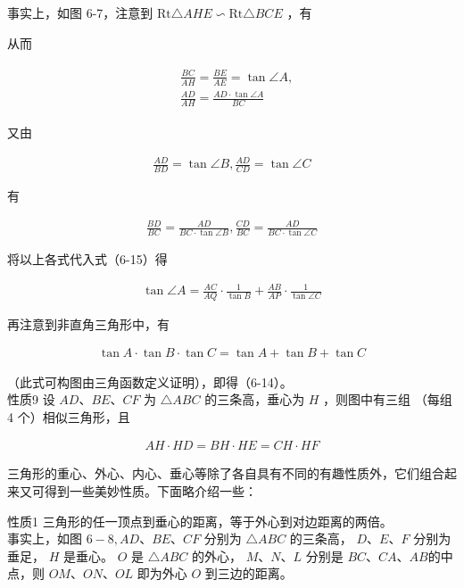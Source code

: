 \documentclass[10pt]{article}
\begin{document}
事实上，如图 6-7，注意到 $\mathrm{Rt} \triangle A H E \backsim \mathrm{Rt} \triangle B C E$ ，有

从而

\begin{align*}
\begin{aligned}
& \frac{B C}{A H}=\frac{B E}{A E}=\tan \angle A, \\
& \frac{A D}{A H}=\frac{A D \cdot \tan \angle A}{B C}
\end{aligned}
\end{align*}

又由

\begin{align*}
\frac{A D}{B D}=\tan \angle B, \frac{A D}{C D}=\tan \angle C
\end{align*}

有

\begin{align*}
\frac{B D}{B C}=\frac{A D}{B C \cdot \tan \angle B}, \frac{C D}{B C}=\frac{A D}{B C \cdot \tan \angle C}
\end{align*}

将以上各式代入式（6-15）得

\begin{align*}
\tan \angle A=\frac{A C}{A Q} \cdot \frac{1}{\tan B}+\frac{A B}{A P} \cdot \frac{1}{\tan \angle C}
\end{align*}

再注意到非直角三角形中，有

\begin{align*}
\tan A \cdot \tan B \cdot \tan C=\tan A+\tan B+\tan C
\end{align*}

（此式可构图由三角函数定义证明），即得（6-14）。\\
性质9 设 $A D 、 B E 、 C F$ 为 $\triangle A B C$ 的三条高，垂心为 $H$ ，则图中有三组 （每组 4 个）相似三角形，且

\begin{align*}
A H \cdot H D=B H \cdot H E=C H \cdot H F
\end{align*}

三角形的重心、外心、内心、垂心等除了各自具有不同的有趣性质外，它们组合起来又可得到一些美妙性质。下面略介绍一些：

性质1 三角形的任一顶点到垂心的距离，等于外心到对边距离的两倍。\\
事实上，如图 $6-8, A D 、 B E 、 C F$ 分别为 $\triangle A B C$ 的三条高， $D 、 E 、 F$ 分别为垂足， $H$ 是垂心。 $O$ 是 $\triangle A B C$ 的外心， $M 、 N 、 L$ 分别是 $B C 、 C A 、 A B$的中点，则 $O M 、 O N 、 O L$ 即为外心 $O$ 到三边的距离。
\end{document}
